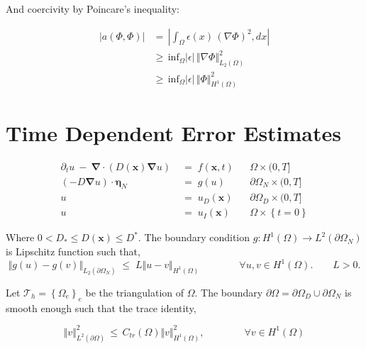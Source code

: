 \documentclass[10pt]{report}
\numberwithin{equation}{section}
\begin{document}
\noindent
And coercivity by Poincare's inequality:

\begin{align*}
|a(\Phi, \Phi)| &= \, |\int_{\Omega} \epsilon(x) \, \left( \nabla \Phi \right)^{2}, dx |  \\
&\geq \,\text{inf}_{\Omega} | \epsilon | \, \Vert \nabla \Phi \Vert^{2}_{L_{2}(\Omega)} \\
&\geq \, \text{inf}_{\Omega} | \epsilon | \, \Vert \Phi \Vert_{H^{1}(\Omega)}^{2}
\end{align*}



\vspace{5mm}

\chapter{Time Dependent Error Estimates}


\begin{align}
\partial_{t} u \ - \ \boldsymbol \nabla \cdot ( D(\textbf{x}) \boldsymbol \nabla u) \; &= \; f(\textbf{x},t) &&  \Omega \times (0,T]  \\
(-D \boldsymbol \nabla u ) \cdot \boldsymbol \eta_{N} \; &= \; g(u) && \partial \Omega_{N} \times (0,T]  \\
u \; &= \; u_{D}(\textbf{x}) &&  \partial \Omega_{D} \times (0,T] \\
u \; &= \; u_{I}(\textbf{x}) &&  \Omega \times \left\{ t=0 \right\}
\end{align}


Where $0 < D_{*} \leq D(\textbf{x}) \leq D^{*}$.  The boundary condition $g: H^{1}(\Omega) \rightarrow L^{2}(\partial \Omega_{N})$ is Lipschitz function such that,
\begin{equation}
\Vert g(u) - g(v) \Vert_{L_{2}(\partial \Omega_{N})} \; \leq \; L
\Vert u - v \Vert_{H^{1}(\Omega)} \qquad \qquad \forall u,v \in H^{1}(\Omega).  \qquad L > 0.
\end{equation}



Let $\mathcal{T}_{h} = \left\{ \Omega_{e} \right\}_{e}$ be the triangulation of $\Omega$. The boundary $\partial \Omega = \partial \Omega_{D} \cup \partial \Omega_{N}$ is smooth enough such that the trace identity,


\begin{equation}
\Vert v \Vert^{2}_{L^{2}(\partial \Omega)} \, \leq \, C_{tr}(\Omega) \Vert v \Vert^{2}_{H^{1}(\Omega)}, \qquad \qquad 
\forall v \in H^{1}(\Omega) \label{eq:Trace}
\end{equation}
\end{document}
